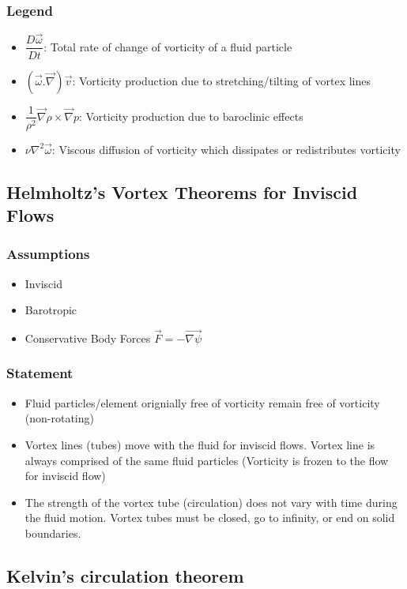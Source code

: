 \documentclass[11pt, letterpaper, notitlepage]{article}
\begin{document}
\subsubsection{Legend}
\begin{itemize}
\item $\dfrac{D\vec{\omega}}{Dt}$: Total rate of change of vorticity of a fluid particle
\item $(\vec{\omega}.\vec{\nabla}) \vec{v}$: Vorticity production due to stretching/tilting of vortex lines
\item $\dfrac{1}{\rho^2} \vec{\nabla} \rho \times \vec{\nabla} p$: Vorticity production due to baroclinic effects
\item $\nu \nabla^2 \vec{\omega}$: Viscous diffusion of vorticity which dissipates or redistributes vorticity
\end{itemize}

\subsection{Helmholtz's Vortex Theorems for Inviscid Flows}
\subsubsection{Assumptions}
\begin{itemize}
\item Inviscid
\item Barotropic
\item Conservative Body Forces $\vec{F} = -\vec{\nabla{\psi}}$
\end{itemize}

\subsubsection{Statement}
\begin{itemize}
\item Fluid particles/element orignially free of vorticity remain free of vorticity (non-rotating)
\item Vortex lines (tubes) move with the fluid for inviscid flows. Vortex line is always comprised of the same fluid particles (Vorticity is frozen to the flow for inviscid flow)
\item The strength of the vortex tube (circulation) does not vary with time during the fluid motion. Vortex tubes must be closed, go to infinity, or end on solid boundaries.
\end{itemize}

\subsection{Kelvin's circulation theorem}
\end{document}

